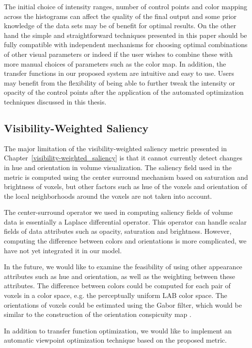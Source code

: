 The initial choice of intensity ranges, number of control points and color mapping across the histograms can affect the quality of the final output and some prior knowledge of the data sets may be of benefit for optimal results. On the other hand the simple and straightforward techniques presented in this paper should be fully compatible with independent mechanisms for choosing optimal combinations of other visual parameters or indeed if the user wishes to combine these with more manual choices of parameters such as the color map.
In addition, the transfer functions in our proposed system are intuitive and easy to use. Users may benefit from the flexibility of being able to further tweak the intensity or opacity of the control points after the application of the automated optimization techniques discussed in this thesis.

\subsection{Visibility-Weighted Saliency}
The major limitation of the visibility-weighted saliency metric presented in Chapter~\ref{visibility-weighted_saliency} is that it cannot currently detect changes in hue and orientation in volume visualization. The saliency field used in the metric is computed using the center surround mechanism based on saturation and brightness of voxels, but other factors such as hue of the voxels and orientation of the local neighborhoods around the voxels are not taken into account.

The center-surround operator \cite{kim_saliency-guided_2006} we used in computing saliency fields of volume data is essentially a Laplace differential operator. This operator can handle scalar fields of data attributes such as opacity, saturation and brightness. However, computing the difference between colors and orientations is more complicated, we have not yet integrated it in our model.

In the future, we would like to examine the feasibility of using other appearance attributes such as hue and orientation, as well as the weighting between these attributes. The difference between colors could be computed for each pair of voxels in a color space, e.g. the perceptually uniform LAB color space. The orientations of voxels could be estimated using the Gabor filter, which would be similar to the construction of the orientation conspicuity map \cite{itti_model_1998}.

In addition to transfer function optimization, we would like to implement an automatic viewpoint optimization technique based on the proposed metric.

